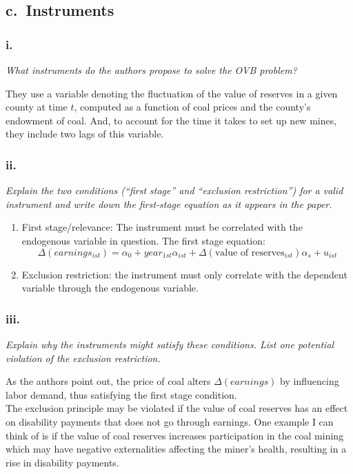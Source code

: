 \documentclass[
]{article}
\begin{document}
\hypertarget{c.-instruments}{%
\subsection{c.~Instruments}\label{c.-instruments}}

\hypertarget{i.-1}{%
\subsubsection{i.}\label{i.-1}}

\textit{What instruments do the authors propose to solve the OVB problem?}

They use a variable denoting the fluctuation of the value of reserves in
a given county at time \(t\), computed as a function of coal prices and
the county's endowment of coal. And, to account for the time it takes to
set up new mines, they include two lags of this variable.

\hypertarget{ii.-1}{%
\subsubsection{ii.}\label{ii.-1}}

\textit{Explain the two conditions (“first stage” and “exclusion restriction”) for a valid instrument and write down the first-stage equation as it appears in the paper.}

\begin{enumerate}
\item First stage/relevance: The instrument must be correlated with the endogenous variable in question. The first stage equation:  
$$\Delta (earnings_{ist}) = \alpha_0 + year_{1st}\alpha_{ist} + \Delta ( \text{value of reserves} _{ist}) \alpha_ s + u_{ist}$$

\item Exclusion restriction: the instrument must only correlate with the dependent variable through the endogenous variable. 
\end{enumerate}

\hypertarget{iii.-1}{%
\subsubsection{iii.}\label{iii.-1}}

\textit{Explain why the instruments might satisfy these conditions. List one potential violation of the exclusion restriction.}

As the authors point out, the price of coal alters \(\Delta (earnings)\)
by influencing labor demand, thus satisfying the first stage
condition.\\
The exclusion principle may be violated if the value of coal reserves
has an effect on disability payments that does not go through earnings.
One example I can think of is if the value of coal reserves increases
participation in the coal mining which may have negative externalities
affecting the miner's health, resulting in a rise in disability
payments.
\end{document}
